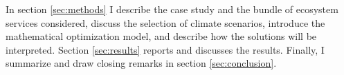 In section \ref{sec:methods} I describe the case study and the bundle of ecosystem services considered, discuss the selection of climate scenarios, introduce the mathematical optimization model, and describe how the solutions will be interpreted. Section \ref{sec:results} reports and discusses the results. Finally, I summarize and draw closing remarks in section \ref{sec:conclusion}.
%
%
%
%
%
%
%
%
